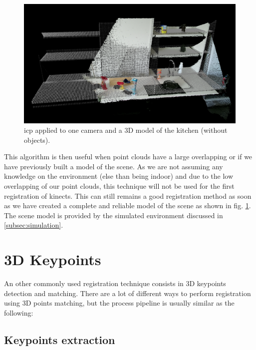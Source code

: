\begin{figure}[h!]
    \centering
    \includegraphics[width=\textwidth]{images/icp_model.png}
    \caption{\acrshort{icp} applied to one camera and a 3D model of the kitchen (without objects).}
    \label{fig:icp_model}
\end{figure}

This algorithm is then useful when point clouds have a large overlapping or if we have previously built a model of the scene. As we are not assuming any knowledge on the environment (else than being indoor) and due to the low overlapping of our point clouds, this technique will not be used for the first registration of kinects. This can still remains a good registration method as soon as we have created a complete and reliable model of the scene as shown in fig. \ref{fig:icp_model}. The scene model is provided by the simulated environment discussed in \ref{subsec:simulation}.

\section{3D Keypoints} \label{sec:3dkp}

An other commonly used registration technique consists in 3D keypoints detection and matching. 
There are a lot of different ways to perform registration using 3D points matching, but the process pipeline is usually similar as the following:

\subsection{Keypoints extraction}

